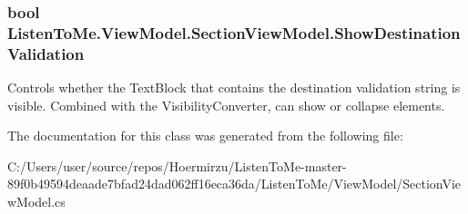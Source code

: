 \subsubsection[{\texorpdfstring{Show\+Destination\+Validation}{ShowDestinationValidation}}]{\setlength{\rightskip}{0pt plus 5cm}bool Listen\+To\+Me.\+View\+Model.\+Section\+View\+Model.\+Show\+Destination\+Validation\hspace{0.3cm}{\ttfamily [get]}}\hypertarget{class_listen_to_me_1_1_view_model_1_1_section_view_model_a82a97f1530d04dd2f88d29b886cc6593}{}\label{class_listen_to_me_1_1_view_model_1_1_section_view_model_a82a97f1530d04dd2f88d29b886cc6593}


Controls whether the Text\+Block that contains the destination validation string is visible. Combined with the Visibility\+Converter, can show or collapse elements. 



The documentation for this class was generated from the following file\+:\begin{DoxyCompactItemize}
\item 
C\+:/\+Users/user/source/repos/\+Hoermirzu/\+Listen\+To\+Me-\/master-\/89f0b49594deaade7bfad24dad062ff16eca36da/\+Listen\+To\+Me/\+View\+Model/Section\+View\+Model.\+cs\end{DoxyCompactItemize}
